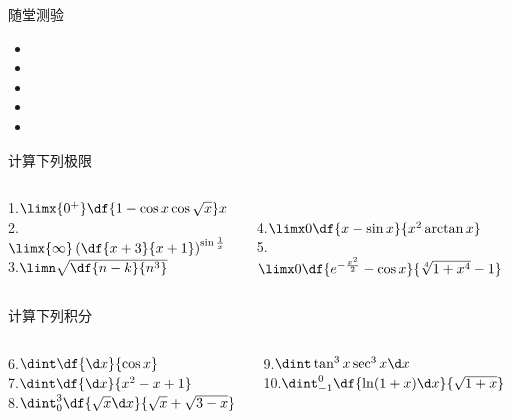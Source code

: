 
\titlepage

\begin{frame}{随堂测验}
	\linespread{1.5}
	  \begin{itemize}
	    \item {}
	    \item {}
	    \item {}
	    \item {}
	    \item {}
	  \end{itemize}
\end{frame}

\begin{frame}{计算下列极限}
	\linespread{1.5}
	\large
	\begin{columns}
		\begin{column}{0.5\textwidth}
			1.\;$\limx{0^+}\df{1-\cos x\cos\sqrt x}x$\\[1ex]
			2.\;$\limx{\infty}\left(\df{x+3}{x+1}\right)^{\sin\frac1x}$\\[1ex]
			3.\;$\limn\sqrt{\df{n-k}{n^3}}$
		\end{column}
		\begin{column}{0.5\textwidth}
			\\[4ex]
			4.\;$\limx0\df{x-\sin x}{x^2\arctan x}$\\[1ex]
			5.\;$\limx0\df{e^{-\frac{x^2}2}-\cos x}{\sqrt[4]{1+x^4}-1}$
		\end{column}
	\end{columns}
\end{frame}

\begin{frame}{计算下列积分}
	\linespread{1.5}
	\large
	\begin{columns}
		\begin{column}{0.5\textwidth}
			6.\;$\dint\df{\d x}{\cos x}$\\[1ex]
			7.\;$\dint\df{\d x}{x^2-x+1}$\\[1ex]
			8.\;$\dint_0^3\df{\sqrt x\d x}{\sqrt x+\sqrt{3-x}}$
		\end{column}
		\begin{column}{0.5\textwidth}
			9.\;$\dint\tan^3x\sec^3x\d x$\\[1ex]
			10.\;$\dint_{-1}^0\df{\ln(1+x)\d x}{\sqrt{1+x}}$
		\end{column}
	\end{columns}
\end{frame}

\begin{frame}
	\Huge
\end{frame}